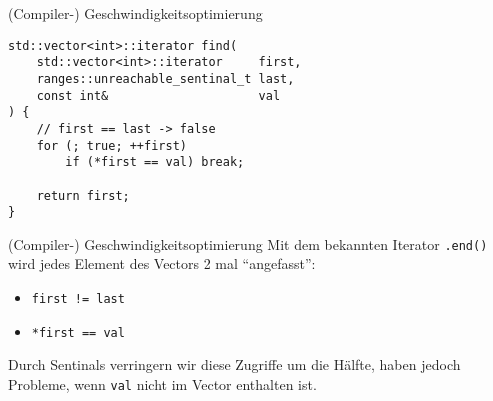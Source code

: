 \begin{frame}[fragile]{(Compiler-) Geschwindigkeitsoptimierung}
    \begin{verbatim}
std::vector<int>::iterator find(
    std::vector<int>::iterator     first,
    ranges::unreachable_sentinal_t last,
    const int&                     val
) {
    // first == last -> false
    for (; true; ++first)
        if (*first == val) break;
    
    return first;
}
    \end{verbatim}
\end{frame}

\begin{frame}[fragile]{(Compiler-) Geschwindigkeitsoptimierung}
    Mit dem bekannten Iterator \texttt{.end()} wird jedes Element des Vectors 2 mal \enquote{angefasst}:
    \begin{itemize}
        \item \texttt{first != last}
        \item \texttt{*first == val}
    \end{itemize}

    \vspace{2.5em}

    Durch Sentinals verringern wir diese Zugriffe um die Hälfte, haben jedoch Probleme, wenn \texttt{val} nicht im Vector enthalten ist.
\end{frame}